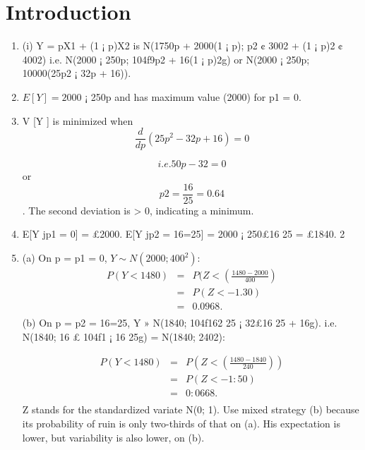 \documentclass[a4paper,12pt]{article}
\begin{document}
\section{Introduction}
\begin{enumerate}
\item (i) Y = pX1 + (1 ¡ p)X2 is N(1750p + 2000(1 ¡ p); p2 ¢ 3002 + (1 ¡ p)2 ¢ 4002)
i.e. N(2000 ¡ 250p; 104f9p2 + 16(1 ¡ p)2g)
or N(2000 ¡ 250p; 10000(25p2 ¡ 32p + 16)).
\item $E[Y ] = 2000$ ¡ 250p and has maximum value (2000) for p1 = 0.
\item V [Y ] is minimized when 
\[ \frac{d}{dp}(25p^2 - 32p + 16) =0\]

\[i.e. 50p - 32 = 0\] or \[p2 = \frac{16}{25}=0.64\].
The second deviation is > 0, indicating a minimum.
\item  E[Y jp1 = 0] = £2000. E[Y jp2 = 16=25] = 2000 ¡ 250£16
25 = £1840.
2
\item  (a) On p = p1 = 0, $Y \sim N(2000; 400^2)$:
\begin{eqnarray*}
P(Y < 1480) &=& P(Z < \left( \frac{1480-2000}{400}
\right) \\
&=& P(Z < -1.30)\\ 
&=& 0.0968.\\
\end{eqnarray*}
(b) On p = p2 = 16=25, Y » N(1840; 104f162
25 ¡ 32£16
25 + 16g).
i.e. N(1840; 16 £ 104f1 ¡ 16
25g) = N(1840; 2402):


\begin{eqnarray*}
P(Y < 1480) &=& P\left(Z < \left( \frac{1480-1840}{240} \right)
\right) \\
&=& P(Z < -1:50)\\ 
&=& 0:0668.\\
\end{eqnarray*}
Z stands for the standardized variate N(0; 1). Use mixed strategy (b) because
its probability of ruin is only two-thirds of that on (a). His expectation
is lower, but variability is also lower, on (b).
\end{enumerate}
\end{document}
